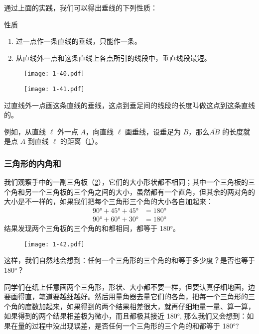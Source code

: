 \medskip
通过上面的实践，我们可以得出垂线的下列性质：
\begin{Theorem}{性质}
	\begin{enumerate}
	\item 过一点作一条直线的垂线，只能作一条。
	\item 从直线外一点和这条直线上各点所引的线段中，垂直线段最短。
\end{enumerate}
\end{Theorem}

\begin{figure}
	\begin{minipage}[b]{0.48\linewidth}
		\centering
		\texttt{[image: 1-40.pdf]}
		\caption{}\label{fig:1-40}
	\end{minipage}
	\begin{minipage}[b]{0.48\linewidth}
		\centering
		\texttt{[image: 1-41.pdf]}
	\caption{}\label{fig:1-41}
	\end{minipage}
\end{figure}

过直线外一点画这条直线的垂线，这点到垂足间的线段的长度叫做这点到这条直线的。

例如，从直线 $\ell$ 外一点 $A$，向直线 $\ell$ 画垂线，设垂足为 $B$，那么$\overline{AB}$ 的长度就是点 $A$ 到直线 $\ell$ 的距离（\cref{fig:1-41}）。

\subsubsection{三角形的内角和}

我们观察手中的一副三角板（\cref{fig:1-42}），它们的大小形状都不相同；其中一个三角板的三个角和另一个三角板的三个角之间的大小，虽然都有一个直角，但其余的两对角的大小是不一样的，如果我们把每个三角形三个角的大小各自加起来：
\[\begin{split}
\ang{90}+\ang{45}+\ang{45}&=\ang{180}\\
\ang{90}+\ang{60}+\ang{30}&=\ang{180}	
\end{split}\]
结果发现两个三角板的三个角的和都相同，都等于 \ang{180}。

\begin{figure}
  \texttt{[image: 1-42.pdf]}
	\caption{}\label{fig:1-42}
\end{figure}

这样，我们自然地会想到：任何一个三角形的三个角的和等于多少度？是否也等于 \ang{180}？

同学们在纸上任意画两个三角形，形状、大小都不要一样，但要认真仔细地画，边要画得直，笔道要越细越好。然后用量角器去量它们的各角，把每一个三角形的三个角的度数加起来，如果得到的两个结果相差很大，就再仔细地量一量、算一算，如果得到的两个结果相差极为微小，而且都极其接近 \ang{180}, 那么我们又会想到：如果在量的过程中没出现误差，是否任何一个三角形的三个角的和都等于 \ang{180}?

